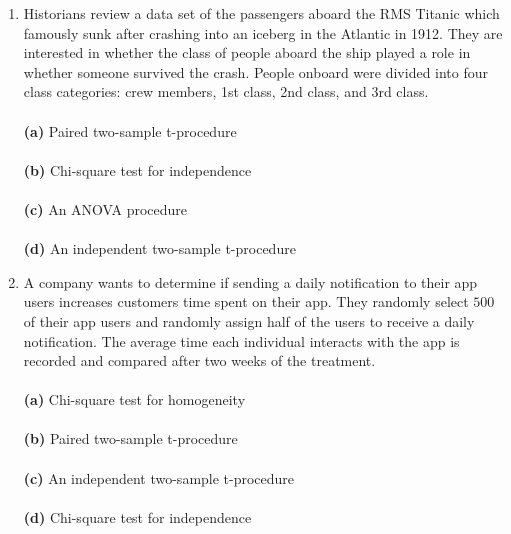 \documentclass[12pt]{article}
\begin{document}
\begin{enumerate}[leftmargin=\labelsep]
\item  Historians review a data set of the passengers aboard the RMS Titanic which famously sunk after crashing into an iceberg in the Atlantic in 1912. They are interested in whether the class of people aboard the ship played a role in whether someone survived the crash. People onboard were divided into four class categories: crew members, 1st class, 2nd class, and 3rd class.\\ \vspace{1mm}\\
{\bf (a)} \hspace{2mm} Paired two-sample t-procedure\\ \vspace{1mm}\\
{\bf (b)} \hspace{2mm} Chi-square test for independence\\   \vspace{1mm}\\
{\bf (c)} \hspace{2mm} An ANOVA procedure\\  \vspace{1mm}\\
{\bf (d)} \hspace{2mm} An independent two-sample t-procedure\\


\item A company wants to determine if sending a daily notification to their app users increases customers time spent on their app. They randomly select $500$ of their app users and randomly assign half of the users to receive a daily notification. The average time each individual interacts with the app is recorded and compared after two weeks of the treatment.\\
\vspace{1mm}\\
{\bf (a)} \hspace{2mm} Chi-square test for homogeneity\\ \vspace{1mm}\\
{\bf (b)} \hspace{2mm} Paired two-sample t-procedure\\   \vspace{1mm}\\
{\bf (c)} \hspace{2mm} An independent two-sample t-procedure\\ \vspace{1mm}\\  
{\bf (d)} \hspace{2mm} Chi-square test for independence\\



\end{enumerate}
\end{document}
